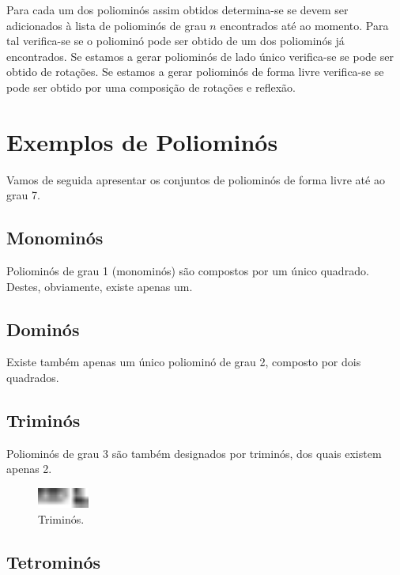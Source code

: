 \documentclass[11pt]{article}
\begin{document}
Para cada um dos poliominós assim obtidos determina-se se devem ser
adicionados à lista de poliominós de grau $n$ encontrados até ao
momento. Para tal verifica-se se o poliominó pode ser obtido de um dos
poliominós já encontrados. Se estamos a gerar poliominós de lado único
verifica-se se pode ser obtido de rotações. Se estamos a gerar
poliominós de forma livre verifica-se se pode ser obtido por uma
composição de rotações e reflexão.





\section{Exemplos de Poliominós}

Vamos de seguida apresentar os conjuntos de poliominós de forma livre
até ao grau 7.


\subsection{Monominós}

Poliominós de grau 1 (monominós) são compostos por um único
quadrado. Destes, obviamente, existe apenas um.


\subsection{Dominós}

Existe também apenas um único poliominó de grau 2, composto por dois
quadrados.


\subsection{Triminós}

Poliominós de grau 3 são também designados por triminós, dos quais
existem apenas 2.

\begin{figure}[H]
\centering
  \includegraphics[width=0.15\textwidth]{../images/poliominos-3-free.pdf}
\caption{Triminós.}
\end{figure}


\subsection{Tetrominós}
\end{document}
